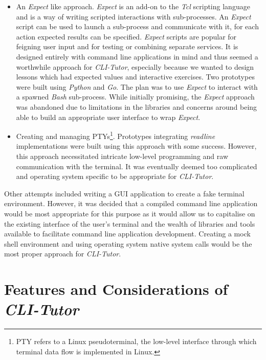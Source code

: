 \begin{itemize} \item An \textit{Expect}\cite{libes1995exploring} like
    approach. \textit{Expect} is an add-on to the \textit{Tcl} scripting
    language and is a way of writing scripted interactions with sub-processes.
    An \textit{Expect} script can be used to launch a sub-process and
    communicate with it, for each action expected results can be specified.
    \textit{Expect} scripts are popular for feigning user input and for testing
    or combining separate services. It is designed entirely with command line
    applications in mind and thus seemed a worthwhile approach for
    \textit{CLI-Tutor}, especially because we wanted to design lessons which
    had expected values and interactive exercises. Two prototypes were built
    using  \textit{Python} and \textit{Go}. The plan was to use \textit{Expect}
    to interact with a spawned \textit{Bash} sub-process. While initially
    promising, the \textit{Expect} approach was abandoned due to limitations in
    the libraries and concerns around being able to build an appropriate user
    interface to wrap \textit{Expect}.

    \item Creating and managing PTYs\footnote{PTY refers to a Linux
        pseudoterminal, the low-level interface through which terminal data
    flow is implemented in Linux.}. Prototypes integrating \textit{readline}
    implementations were built using this approach with some success. However,
    this approach necessitated intricate low-level programming and raw
    communication with the terminal. It was eventually deemed too complicated
    and operating system specific to be appropriate for \textit{CLI-Tutor}. 

\end{itemize}

    Other attempts included writing a GUI application to create a fake terminal
    environment. However, it was decided that a compiled command line
    application would be most appropriate for this purpose as it would allow us
    to capitalise on the existing interface of the user's terminal and the
    wealth of libraries and tools available to facilitate command line
    application development. Creating a mock shell environment and using
    operating system native system calls would be the most proper approach for
    \textit{CLI-Tutor}.

\section{Features and Considerations of \textit{CLI-Tutor}}

